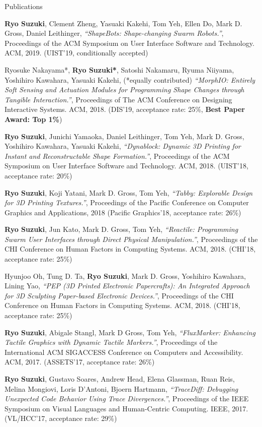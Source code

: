 \documentclass{resume} %
\begin{document}
\begin{rSection}{Publications}

{\bf Ryo Suzuki}, Clement Zheng, Yasuaki Kakehi, Tom Yeh, Ellen Do, Mark D. Gross, Daniel Leithinger,
{\it ``ShapeBots: Shape-changing Swarm Robots.''},
Proceedings of the ACM Symposium on User Interface Software and Technology. ACM, 2019.
(UIST'19, conditionally accepted)

Ryosuke Nakayama*, {\bf Ryo Suzuki*}, Satoshi Nakamaru, Ryuma Niiyama, Yoshihiro Kawahara, Yasuaki Kakehi, (*equally contributed)
{\it ``MorphIO: Entirely Soft Sensing and Actuation Modules for Programming Shape Changes through Tangible Interaction.''},
Proceedings of The ACM Conference on Designing Interactive Systems. ACM, 2018.
(DIS'19, acceptance rate: 25\%, {\bf Best Paper Award: Top 1\%})

{\bf Ryo Suzuki}, Junichi Yamaoka, Daniel Leithinger, Tom Yeh, Mark D. Gross, Yoshihiro Kawahara, Yasuaki Kakehi,
{\it ``Dynablock: Dynamic 3D Printing for Instant and Reconstructable Shape Formation.''},
Proceedings of the ACM Symposium on User Interface Software and Technology. ACM, 2018.
(UIST'18, acceptance rate: 20\%)

{\bf Ryo Suzuki}, Koji Yatani, Mark D. Gross, Tom Yeh,
{\it ``Tabby: Explorable Design for 3D Printing Textures.''},
Proceedings of the Pacific Conference on Computer Graphics and Applications, 2018
(Pacific Graphics'18, acceptance rate: 26\%)

{\bf Ryo Suzuki}, Jun Kato, Mark D. Gross, Tom Yeh,
{\it ``Reactile: Programming Swarm User Interfaces through Direct Physical Manipulation.''},
Proceedings of the CHI Conference on Human Factors in Computing Systems. ACM, 2018. 
(CHI'18, acceptance rate: 25\%)

Hyunjoo Oh, Tung D. Ta, {\bf Ryo Suzuki}, Mark D. Gross, Yoshihiro Kawahara, Lining Yao,
{\it ``PEP (3D Printed Electronic Papercrafts): An Integrated Approach for 3D Sculpting Paper-based Electronic Devices.''},
Proceedings of the CHI Conference on Human Factors in Computing Systems. ACM, 2018. 
(CHI'18, acceptance rate: 25\%)

{\bf Ryo Suzuki}, Abigale Stangl, Mark D Gross, Tom Yeh,
{\it ``FluxMarker: Enhancing Tactile Graphics with Dynamic Tactile Markers.''}, 
Proceedings of the International ACM SIGACCESS Conference on Computers and Accessibility. ACM, 2017. 
(ASSETS'17, acceptance rate: 26\%)

{\bf Ryo Suzuki}, Gustavo Soares, Andrew Head, Elena Glassman, Ruan Reis, Melina Mongiovi, Loris D'Antoni, Bjoern Hartmann,
{\it ``TraceDiff: Debugging Unexpected Code Behavior Using Trace Divergences.''},
Proceedings of the IEEE Symposium on Visual Languages and Human-Centric Computing. IEEE, 2017. 
(VL/HCC'17, acceptance rate: 29\%)


\end{rSection}
\end{document}
